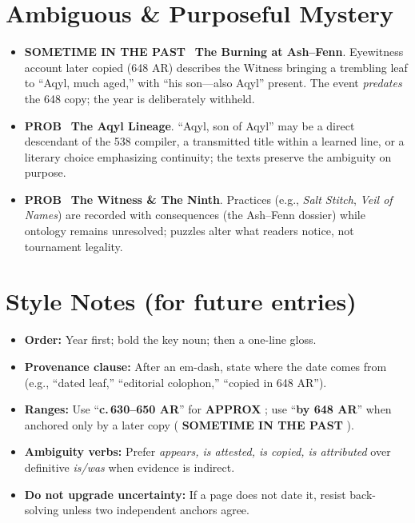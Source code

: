 \documentclass[11pt]{article}
\newcommand{\badge}[3]{%
  {\setlength{\fboxsep}{2pt}\colorbox{#1}{\textcolor{#2}{\sffamily\footnotesize\textbf{#3}}}}%
}
\newcommand{\prob}{\badge{probbg}{probfg}{PROB}}
\newcommand{\appx}{\badge{appxbg}{appxfg}{APPROX}}
\newcommand{\past}{\badge{pastbg}{pastfg}{SOMETIME IN THE PAST}}
\begin{document}
\section*{Ambiguous \& Purposeful Mystery}
\begin{itemize}
  \item \past\ \textbf{The Burning at Ash--Fenn}. Eyewitness account later copied (648 AR) describes the Witness bringing a trembling leaf to ``Aqyl, much aged,'' with ``his son---also Aqyl'' present. The event \emph{predates} the 648 copy; the year is deliberately withheld.
  \item \prob\ \textbf{The Aqyl Lineage}. ``Aqyl, son of Aqyl'' may be a direct descendant of the 538 compiler, a transmitted title within a learned line, or a literary choice emphasizing continuity; the texts preserve the ambiguity on purpose.
  \item \prob\ \textbf{The Witness \& The Ninth}. Practices (e.g., \emph{Salt Stitch}, \emph{Veil of Names}) are recorded with consequences (the Ash--Fenn dossier) while ontology remains unresolved; puzzles alter what readers notice, not tournament legality.
\end{itemize}

\section*{Style Notes (for future entries)}
\begin{itemize}
  \item \textbf{Order:} Year first; bold the key noun; then a one-line gloss.
  \item \textbf{Provenance clause:} After an em-dash, state where the date comes from (e.g., ``dated leaf,'' ``editorial colophon,'' ``copied in 648 AR'').
  \item \textbf{Ranges:} Use ``\textbf{c.\,630--650 AR}'' for \appx; use ``\textbf{by 648 AR}'' when anchored only by a later copy (\past).
  \item \textbf{Ambiguity verbs:} Prefer \emph{appears, is attested, is copied, is attributed} over definitive \emph{is/was} when evidence is indirect.
  \item \textbf{Do not upgrade uncertainty:} If a page does not date it, resist back-solving unless two independent anchors agree.
\end{itemize}
\end{document}
